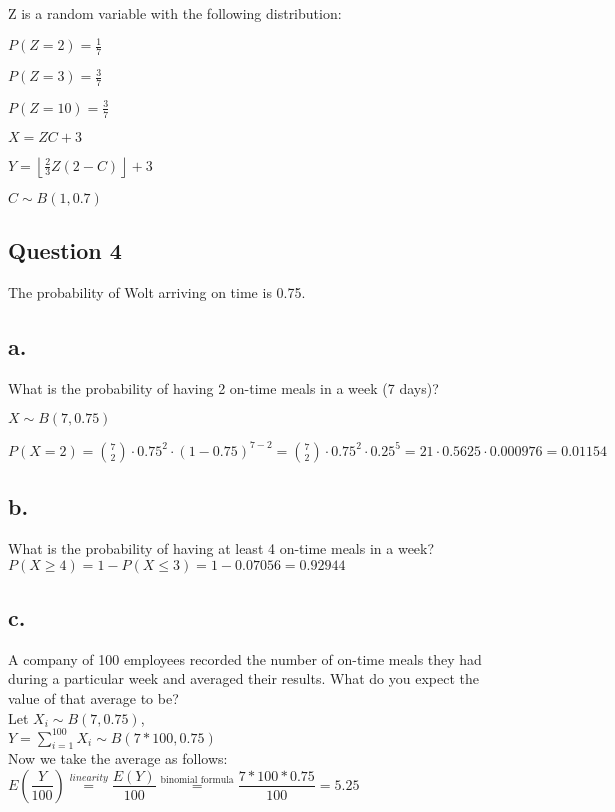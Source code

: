 \documentclass[12pt]{article}
\newcommand\tab[1][1cm]{\hspace*{#1}}
\begin{document}
Z is a random variable with the following distribution:

$ P(Z = 2) = \frac{1}{7} $

$ P(Z = 3) = \frac{3}{7} $

$ P(Z = 10) = \frac{3}{7} $


$ X = ZC + 3 $

$ Y = \left \lfloor{\frac{2}{3}Z(2-C)}\right \rfloor + 3 $

$ C \sim B(1, 0.7) $

\newpage

\begin{center}
\section*{Question 4}
\end{center}

The probability of Wolt arriving on time is 0.75.

\subsection*{a.} 

What is the probability of having 2 on-time meals in a week (7 days)?

$ X \sim B(7, 0.75) $

$ P(X=2) = \binom{7}{2} \cdot 0.75^2 \cdot(1-0.75)^{7-2} = \binom{7}{2} \cdot 0.75^2 \cdot 0.25^5 = 21 \cdot 0.5625 \cdot 0.000976 = 0.01154 $

\subsection*{b.}

What is the probability of having at least 4 on-time meals in a week? \\

$ P(X \geq 4) =  1 - P(X \leq 3) = 1 - 0.07056 = 0.92944$ 

\subsection*{c.}

\tab A company of 100 employees recorded the number of on-time meals they had during a particular week and averaged their results. What do you expect the value of that average to be? \\

Let $X_i \sim B(7, 0.75) $, \\

$Y = \sum_{i=1}^{100} X_i \sim B(7* 100, 0.75) $\\

Now we take the average as follows: \\

$E(\dfrac{Y}{100}) \stackrel{linearity}{=} \dfrac{E(Y)}{100} \stackrel{\text{binomial formula}}{=} \dfrac{7*100*0.75}{100}  = 5.25 $

    
\end{document}
